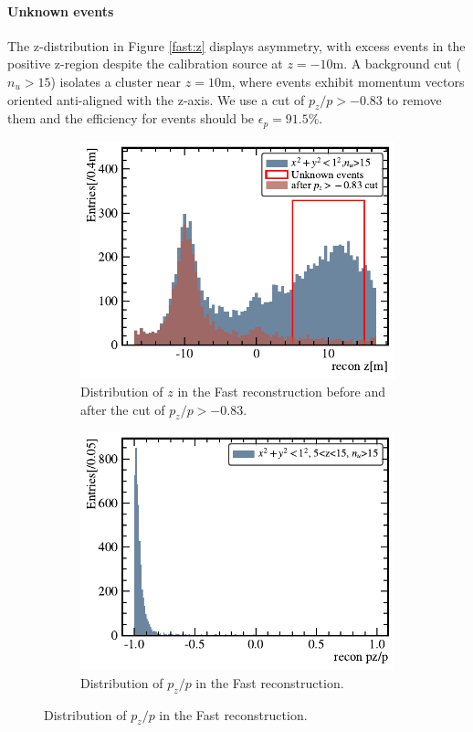 \paragraph{Unknown events}
The z-distribution in Figure \ref{fast:z} displays asymmetry, with excess events in the positive z-region despite the calibration source at $z=-10$\si{m}. A background cut ($n_u>15$) isolates a cluster near $z=10$\si{m}, where events exhibit momentum vectors oriented anti-aligned with the z-axis. We use a cut of $p_z/p>-0.83$ to remove them and the efficiency for events should be $\epsilon_p=91.5$\si{\percent}.
\begin{figure}[!htbp]
	\centering
	\begin{subfigure}[b]{0.4\textwidth}
		\includegraphics[width=\textwidth]{neutrontag/fastrecon/z_pz.pdf}
		\caption{Distribution of $z$ in the Fast reconstruction before and after the cut of $p_z/p>-0.83$.}
		\label{fast:pzcut}
	\end{subfigure}

	\begin{subfigure}[b]{0.4\textwidth}
		\includegraphics[width=\textwidth]{neutrontag/fastrecon/pz.pdf}
		\caption{Distribution of $p_z/p$ in the Fast reconstruction.}
		\label{fast:pz}
	\end{subfigure}


\end{figure}
